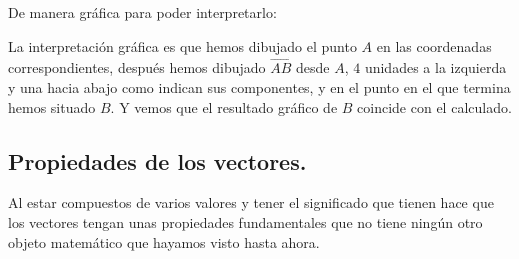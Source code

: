 \documentclass[a4paper,11pt,answers]{exam}
\begin{document}
\begin{questions}
\begin{solution}
    De manera gráfica para poder interpretarlo:
    \begin{center}
    \end{center}
  \end{solution}
  La interpretación gráfica es que hemos dibujado el punto $A$ en las coordenadas correspondientes,
  después hemos dibujado $\overrightarrow{AB}$ desde $A$, $4$ unidades a la izquierda y una
  hacia abajo como indican sus componentes, y en el punto en el que termina
  hemos situado $B$.
  Y vemos que el resultado gráfico de $B$ coincide con el calculado.
\end{questions}

\subsection{Propiedades de los vectores.}
Al estar compuestos de varios valores y tener el significado que tienen hace que los vectores
tengan unas propiedades fundamentales que no tiene ningún otro objeto matemático que hayamos
visto hasta ahora.\\
\end{document}
